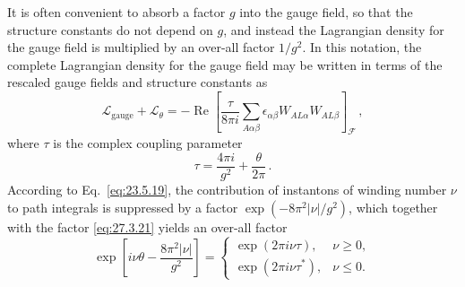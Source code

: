 It is often convenient to absorb a factor \(g\) into the gauge field, so
that the structure constants do not depend on \(g\), and instead the
Lagrangian density for the gauge field is multiplied by an over-all factor
\(1/g^2\). In this notation, the complete Lagrangian density for the gauge
field may be written in terms of the rescaled gauge fields and structure
constants as
\begin{equation}
  \mathcal{L}_{\mathrm{gauge}}+\mathcal{L}_\theta
  =-\operatorname{Re}\left[
    \frac{\tau}{8\pi i}
    \sum_{A\alpha\beta}
    \epsilon_{\alpha\beta}W_{AL\alpha}W_{AL\beta}
  \right]_{\mathcal{F}}\,,
  \tag{27.3.22}\label{eq:27.3.22}
\end{equation}
where \(\tau\) is the complex coupling parameter
\begin{equation}
  \tau=\frac{4\pi i}{g^2}+\frac{\theta}{2\pi}\,.
  \tag{27.3.23}\label{eq:27.3.23}
\end{equation}
According to Eq.~\eqref{eq:23.5.19}, the contribution of instantons of
winding number \(\nu\) to path integrals is suppressed by a factor
\(\exp(-8\pi^2|\nu|/g^2)\), which together with the factor
\eqref{eq:27.3.21} yields an over-all factor
\begin{equation}
  \exp\left[
    i\nu\theta-\frac{8\pi^2|\nu|}{g^2}
  \right]
  =
  \begin{cases}
    \exp(2\pi i\nu\tau), & \nu\geq 0,\\
    \exp(2\pi i\nu\tau^*), & \nu\leq 0.
  \end{cases}
  \tag{27.3.24}\label{eq:27.3.24}
\end{equation}
